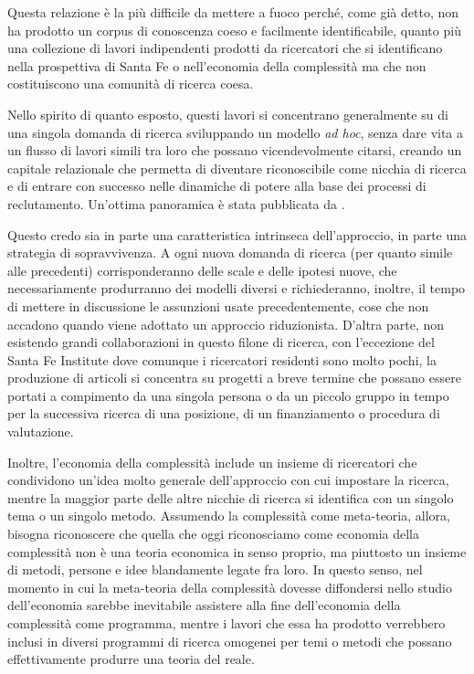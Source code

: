 \documentclass[a4paper, headings=standardclasses]{scrartcl}
\begin{document}
Questa relazione è la più difficile da mettere a fuoco perché, come già detto, non ha prodotto un corpus di conoscenza coeso e facilmente identificabile, quanto più una collezione di lavori indipendenti prodotti da ricercatori che si identificano nella prospettiva di Santa Fe o nell'economia della complessità ma che non costituiscono una comunità di ricerca coesa.

Nello spirito di quanto esposto, questi lavori si concentrano generalmente su di una singola domanda di ricerca sviluppando un modello \textit{ad hoc}, senza dare vita a un flusso di lavori simili tra loro che possano vicendevolmente citarsi, creando un capitale relazionale che permetta di diventare riconoscibile come nicchia di ricerca e di entrare con successo nelle dinamiche di potere alla base dei processi di reclutamento. Un'ottima panoramica è stata pubblicata da \textcite{arthur2021}.

Questo credo sia in parte una caratteristica intrinseca dell'approccio, in parte una strategia di sopravvivenza.
A ogni nuova domanda di ricerca (per quanto simile alle precedenti) corrisponderanno delle scale e delle ipotesi nuove, che necessariamente produrranno dei modelli diversi e richiederanno, inoltre, il tempo di mettere in discussione le assunzioni usate precedentemente, cose che non accadono quando viene adottato un approccio riduzionista.
D'altra parte, non esistendo grandi collaborazioni in questo filone di ricerca, con l'eccezione del Santa Fe Institute dove comunque i ricercatori residenti sono molto pochi, la produzione di articoli si concentra su progetti a breve termine che possano essere portati a compimento da una singola persona o da un piccolo gruppo in tempo per la successiva ricerca di una posizione, di un finanziamento o procedura di valutazione.

Inoltre, l'economia della complessità include un insieme di ricercatori che condividono un'idea molto generale dell'approccio con cui impostare la ricerca, mentre la maggior parte delle altre nicchie di ricerca si identifica con un singolo tema o un singolo metodo.
Assumendo la complessità come meta-teoria, allora, bisogna riconoscere che quella che oggi riconosciamo come economia della complessità non è una teoria economica in senso proprio, ma piuttosto un insieme di metodi, persone e idee blandamente legate fra loro.
In questo senso, nel momento in cui la meta-teoria della complessità dovesse diffondersi nello studio dell'economia sarebbe inevitabile assistere alla fine dell'economia della complessità come programma, mentre i lavori che essa ha prodotto verrebbero inclusi in diversi programmi di ricerca omogenei per temi o metodi che possano effettivamente produrre una teoria del reale.
\end{document}
